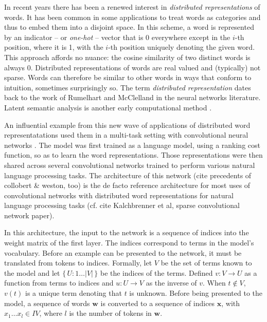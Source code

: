 In recent years there has been a renewed interest in  \textit{distributed representations} of words.  It has been common in some applications to treat words as categories and thus to embed them into a disjoint space.  In this scheme, a word is represented by an indicator -- or \textit{one-hot} -- vector that is 0 everywhere except in the $i$-th position, where it is 1, with the $i$-th position uniquely denoting the given word.  This approach affords no nuance: the cosine similarity of two distinct words is always 0.  Distributed representations of words are real valued and (typically) not sparse.  Words can therefore be similar to other words in ways that conform to intuition, sometimes surprisingly so.  The term \textit{distributed representation} dates back to the work of Rumelhart and McClelland in the neural networks literature.  Latent semantic analysis is another early computational method .

An influential example from this new wave of applications of distributed word representatations used them in a multi-task setting with convolutional neural networks \cite{collobert2008unified}.  The model was first trained as a language model, using a ranking cost function, so as to learn the word representations.  Those representations were then shared across several convolutional networks trained to perform various natural language processing tasks.  The architecture of this network (cite precedents of collobert \& weston, too) is the de facto reference architecture for most uses of convolutional networks with distributed word representations for natural language processing tasks (cf. cite Kalchbrenner et al, sparse convolutional network paper).

In this architecture, the input to the network is a sequence of indices into the weight matrix of the first layer.  The indices correspond to terms in the model's vocabulary.  Before an example can be presented to the network, it must be translated from tokens to indices.  Formally, let $V$ be the set of terms known to the model and let $\{\,U : 1 \ldots |V|\,\}$ be the indices of the terms.  Defined $v \colon V \to U$ as a function from terms to indices and $u \colon U \to V$ as the inverse of $v$.  When $t \notin V$, $v(t)$ is a unique term denoting that $t$ is unknown.  Before being presented to the model, a sequence of words $\mathbf{w}$ is converted to a sequence of indices $\mathbf{x}$, with $x_1 \ldots x_{l} \in IV$, where $l$ is the number of tokens in $\mathbf{w}$.

